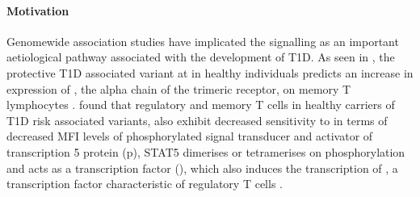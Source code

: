 \paragraph{Motivation}
Genomewide association studies have implicated the  signalling as an important aetiological pathway associated with the development of \gls{T1D}.  
As seen in , the protective T1D associated  variant at  in healthy individuals predicts an increase in expression of ,
the alpha chain of the trimeric  receptor, on memory \positive T lymphocytes \citep{Dendrou:2008gc,Dendrou:2009dv}.
\citet{Garg:2012jr} found that regulatory and memory \positive T cells in healthy carriers of T1D risk associated  variants,
also exhibit decreased sensitivity to  in terms of decreased MFI levels of
phosphorylated signal transducer and activator of transcription 5 protein (p),
STAT5 dimerises or tetramerises on phosphorylation and acts as
a transcription factor (),
which also induces the transcription of , a transcription factor characteristic of regulatory T cells .


